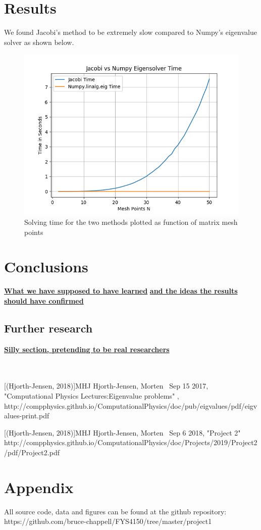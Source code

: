\documentclass{emulateapj}
\begin{document}
\section{Results}
\label{sec:results}
We found Jacobi's method to be extremely slow compared to Numpy's eigenvalue solver as shown below.
\begin{figure}[H]
    \centering
    \includegraphics[scale=0.5]{jacobi_numpy_time.png}
    \caption{Solving time for the two methods plotted as function of matrix mesh points}
    \label{fig:1}
\end{figure}






\section{Conclusions}
\label{sec:conclusions}
\underline{\textbf{What we have supposed to have learned}}
\underline{\textbf{and the ideas the results should have confirmed}}
\subsection{Further research}
\underline{\textbf{Silly section, pretending to be real researchers}}
\\
\\
\\
\newpage
\begin{thebibliography}{}
[(Hjorth-Jensen, 2018)]{MHJ} Hjorth-Jensen, Morten \, Sep 15 2017, "Computational Physics Lectures:Eigenvalue problems" , http://compphysics.github.io/ComputationalPhysics/doc/pub/eigvalues/pdf/eigvalues-print.pdf

[(Hjorth-Jensen, 2018)]{MHJ} Hjorth-Jensen, Morten \, Sep 6 2018, "Project 2"
http://compphysics.github.io/ComputationalPhysics/doc/Projects/2019/Project2/pdf/Project2.pdf

\end{thebibliography}

\section{Appendix}
All source code, data and figures can be found at the github repository: https://github.com/bruce-chappell/FYS4150/tree/master/project1
\end{document}
